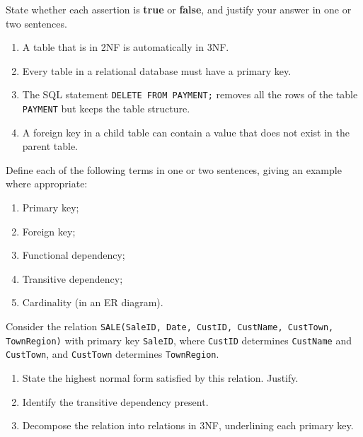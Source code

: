 \documentclass[11pt]{article}
\newcommand{\cle}[1]{{\popxbold\color{popdark}#1}}
\newcounter{popsec}
\newcounter{popsub}
\newcommand{\courssub}[1]{%
  \stepcounter{popsub}%
  \par\vspace{9pt}\noindent{\popxbold\fontsize{11.5}{13}\selectfont\color{popink}{\color{poporange}\thepopsec.\thepopsub}\hspace{6pt}#1}\par\nopagebreak\vspace{4pt}
}
\begin{document}
\begin{exercice}
State whether each assertion is \textbf{true} or \textbf{false}, and justify your answer in one or two sentences.
\begin{enumerate}
\item A table that is in 2NF is automatically in 3NF.
\item Every table in a relational database must have a primary key.
\item The SQL statement \texttt{DELETE FROM PAYMENT;} removes all the rows of the table \texttt{PAYMENT} but keeps the table structure.
\item A foreign key in a child table can contain a value that does not exist in the parent table.
\end{enumerate}
\end{exercice}

\begin{exercice}
Define each of the following terms in one or two sentences, giving an example where appropriate:
\begin{enumerate}
\item \cle{Primary key};
\item \cle{Foreign key};
\item \cle{Functional dependency};
\item \cle{Transitive dependency};
\item \cle{Cardinality} (in an ER diagram).
\end{enumerate}
\end{exercice}

\begin{exercice}
Consider the relation \texttt{SALE(SaleID, Date, CustID, CustName, CustTown, TownRegion)} with primary key \texttt{SaleID}, where \texttt{CustID} determines \texttt{CustName} and \texttt{CustTown}, and \texttt{CustTown} determines \texttt{TownRegion}.
\begin{enumerate}
\item State the highest normal form satisfied by this relation. Justify.
\item Identify the transitive dependency present.
\item Decompose the relation into relations in 3NF, underlining each primary key.
\end{enumerate}
\end{exercice}

\courssub{I practise}
\end{document}
